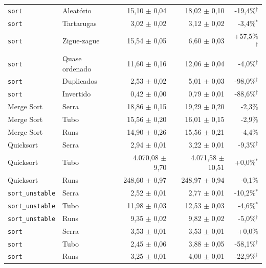 \begin{tabular}{llrrr}
\texttt{sort} & Aleatório & 15{,}10 $\pm$ 0{,}04 & 18{,}02 $\pm$ 0{,}10 & -19{,}4\%$^{\dagger}$ \\
\texttt{sort} & Tartarugas & 3{,}02 $\pm$ 0{,}02 & 3{,}12 $\pm$ 0{,}02 & -3{,}4\%$^{*}$ \\
\texttt{sort} & Zigue-zague & 15{,}54 $\pm$ 0{,}05 & 6{,}60 $\pm$ 0{,}03 & +57{,}5\%$^{\dagger}$ \\
\texttt{sort} & Quase ordenado & 11{,}60 $\pm$ 0{,}16 & 12{,}06 $\pm$ 0{,}04 & -4{,}0\%$^{\dagger}$ \\
\texttt{sort} & Duplicados & 2{,}53 $\pm$ 0{,}02 & 5{,}01 $\pm$ 0{,}03 & -98{,}0\%$^{\dagger}$ \\
\texttt{sort} & Invertido & 0{,}42 $\pm$ 0{,}00 & 0{,}79 $\pm$ 0{,}01 & -88{,}6\%$^{\dagger}$ \\
\hline
Merge Sort & Serra & 18{,}86 $\pm$ 0{,}15 & 19{,}29 $\pm$ 0{,}20 & -2{,}3\% \\
Merge Sort & Tubo & 15{,}56 $\pm$ 0{,}20 & 16{,}01 $\pm$ 0{,}15 & -2{,}9\% \\
Merge Sort & Runs & 14{,}90 $\pm$ 0{,}26 & 15{,}56 $\pm$ 0{,}21 & -4{,}4\% \\
Quicksort & Serra & 2{,}94 $\pm$ 0{,}01 & 3{,}22 $\pm$ 0{,}01 & -9{,}3\%$^{\dagger}$ \\
Quicksort & Tubo & 4.070{,}08 $\pm$ 9{,}70 & 4.071{,}58 $\pm$ 10{,}51 & +0{,}0\%$^{*}$ \\
Quicksort & Runs & 248{,}60 $\pm$ 0{,}97 & 248{,}97 $\pm$ 0{,}94 & -0{,}1\% \\
\texttt{sort\_unstable} & Serra & 2{,}52 $\pm$ 0{,}01 & 2{,}77 $\pm$ 0{,}01 & -10{,}2\%$^{*}$ \\
\texttt{sort\_unstable} & Tubo & 11{,}98 $\pm$ 0{,}03 & 12{,}53 $\pm$ 0{,}03 & -4{,}6\%$^{*}$ \\
\texttt{sort\_unstable} & Runs & 9{,}35 $\pm$ 0{,}02 & 9{,}82 $\pm$ 0{,}02 & -5{,}0\%$^{\dagger}$ \\
\texttt{sort} & Serra & 3{,}53 $\pm$ 0{,}01 & 3{,}53 $\pm$ 0{,}01 & +0{,}0\% \\
\texttt{sort} & Tubo & 2{,}45 $\pm$ 0{,}06 & 3{,}88 $\pm$ 0{,}05 & -58{,}1\%$^{\dagger}$ \\
\texttt{sort} & Runs & 3{,}25 $\pm$ 0{,}01 & 4{,}00 $\pm$ 0{,}01 & -22{,}9\%$^{\dagger}$ \\
\hline
\end{tabular}

